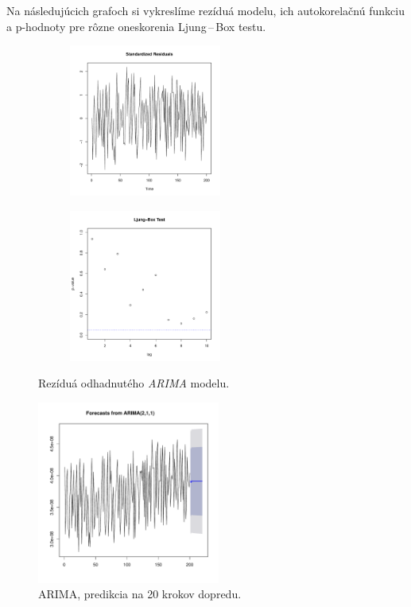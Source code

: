 \documentclass[12pt,a4paper,oneside,final]{article}
\theoremstyle{definition}
\theoremstyle{remark}
\numberwithin{equation}{section}
\begin{document}
Na následujúcich grafoch si vykreslíme rezíduá modelu, ich autokorelačnú funkciu a p-hodnoty
pre rôzne oneskorenia Ljung\,--\,Box testu.

\begin{figure}[H] \centering
    \begin{subfigure}{0.55\textwidth}
        \centering
        \includegraphics[width=1\linewidth,height=5cm]{images/heap_resid.pdf}
        \label{obr:heap_resid_resid}
    \end{subfigure}
    \begin{subfigure}{0.55\textwidth}
        \centering
        \includegraphics[width=1\linewidth,height=5cm]{images/heap_box.pdf}
    \end{subfigure}
    \caption{Rezíduá odhadnutého \emph{ARIMA} modelu.}
     \label{obr:heap_resid}
\end{figure}

\begin{figure}[H]
    \begin{center}
        \includegraphics[width=.8\textwidth,height=6cm]{images/heap_forecast.pdf}
        \caption{ARIMA, predikcia na 20 krokov dopredu.}
        \label{obr:heap_forecast}
    \end{center}
\end{figure}
\end{document}
